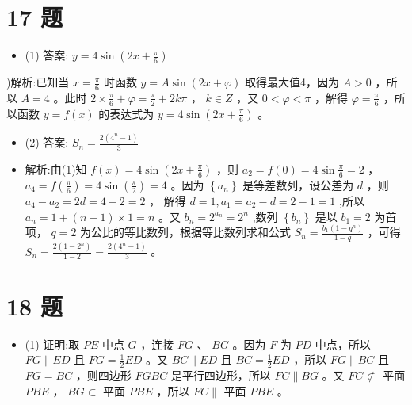 \documentclass[10pt]{article}
\begin{document}
\section*{17 题}

\begin{itemize}\relax
\item\relax (1) 答案: \(y = 4\sin \left( {{2x} + \frac{\pi }{6}}\right)\)
\end{itemize}

)解析:已知当 \(x = \frac{\pi }{6}\) 时函数 \(y = A\sin \left( {{2x} + \varphi }\right)\) 取得最大值4，因为 \(A > 0\) ，所以 \(A = 4\) 。此时 \(2 \times  \frac{\pi }{6} + \varphi  = \frac{\pi }{2} + {2k\pi }\text{ ， }k \in  Z\) ，又 \(0 < \varphi  < \pi\) ，解得 \(\varphi  = \frac{\pi }{6}\) ，所以函数 \(y = f\left( x\right)\) 的表达式为 \(y = 4\sin \left( {{2x} + \frac{\pi }{6}}\right)\) 。

\begin{itemize}\relax
\item\relax (2) 答案: \({S}_{n} = \frac{2\left( {{4}^{n} - 1}\right) }{3}\)
\end{itemize}

\begin{itemize}\relax
\item\relax 解析:由(1)知 \(f\left( x\right)  = 4\sin \left( {{2x} + \frac{\pi }{6}}\right)\) ，则 \({a}_{2} = f\left( 0\right)  = 4\sin \frac{\pi }{6} = 2\) ， \({a}_{4} = f\left( \frac{\pi }{6}\right)  = 4\sin \left( \frac{\pi }{2}\right)  = 4\) 。因为 \(\left\{  {a}_{n}\right\}\) 是等差数列，设公差为 \(d\) ，则 \({a}_{4} - {a}_{2} = {2d} = 4 - 2 = 2\) ， 解得 \(d = 1,{a}_{1} = {a}_{2} - d = 2 - 1 = 1\) ,所以 \({a}_{n} = 1 + \left( {n - 1}\right)  \times  1 = n\) 。又 \({b}_{n} = {2}^{{a}_{n}} = {2}^{n}\) ,数列 \(\left\{  {b}_{n}\right\}\) 是以 \({b}_{1} = 2\) 为首项， \(q = 2\) 为公比的等比数列，根据等比数列求和公式 \({S}_{n} = \frac{{b}_{1}\left( {1 - {q}^{n}}\right) }{1 - q}\) ，可得 \({S}_{n} = \frac{2\left( {1 - {2}^{n}}\right) }{1 - 2} = \frac{2\left( {{4}^{n} - 1}\right) }{3}\) 。
\end{itemize}

\section*{18 题}

\begin{itemize}\relax
\item\relax (1) 证明:取 \({PE}\) 中点 \(G\) ，连接 \({FG}\) 、 \({BG}\) 。因为 \(F\) 为 \({PD}\) 中点，所以 \({FG} \parallel  {ED}\) 且 \({FG} = \frac{1}{2}{ED}\) 。又 \({BC} \parallel  {ED}\) 且 \({BC} = \frac{1}{2}{ED}\) ，所以 \({FG} \parallel  {BC}\) 且 \({FG} = {BC}\) ，则四边形 \({FGBC}\) 是平行四边形，所以 \({FC}\parallel {BG}\) 。又 \({FC} \text{ ⊄ }\) 平面 \({PBE}\) ， \({BG} \subset\) 平面 \({PBE}\) ，所以 \({FC}\parallel\) 平面 \({PBE}\) 。
\end{itemize}
\end{document}
